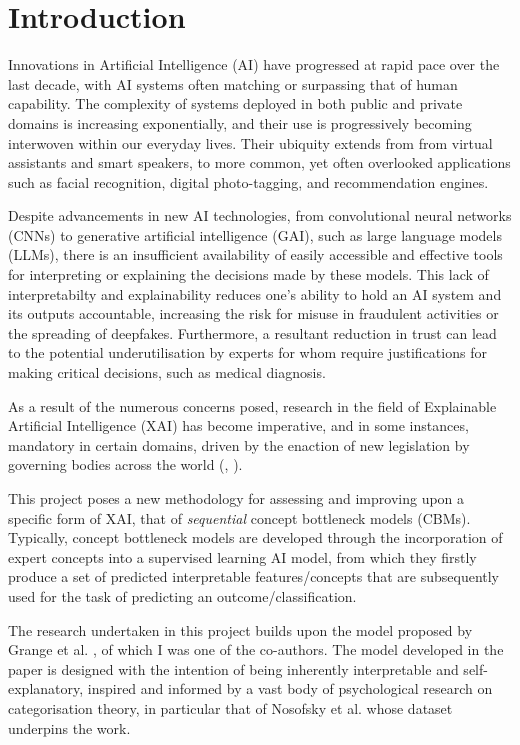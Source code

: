 \chapter{Introduction}

Innovations in Artificial Intelligence (AI) have progressed at rapid pace over the last decade, with AI systems often matching or surpassing that of human capability. The complexity of systems deployed in both public and private domains is increasing exponentially, and their use is progressively becoming interwoven within our everyday lives. Their ubiquity extends from from virtual assistants and smart speakers, to more common, yet often overlooked applications such as facial recognition, digital photo-tagging, and recommendation engines.

Despite advancements in new AI technologies, from convolutional neural networks (CNNs) to generative artificial intelligence (GAI), such as large language models (LLMs), there is an insufficient availability of easily accessible and effective tools for interpreting or explaining the decisions made by these models. This lack of interpretabilty and explainability reduces one's ability to hold an AI system and its outputs accountable, increasing the risk for misuse in fraudulent activities or the spreading of deepfakes. Furthermore, a resultant reduction in trust can lead to the potential underutilisation by experts for whom require justifications for making critical decisions, such as medical diagnosis. 

As a result of the numerous concerns posed, research in the field of Explainable Artificial Intelligence (XAI) has become imperative, and in some instances, mandatory in certain domains, driven by the enaction of new legislation by governing bodies across the world (\cite{worldeconomicforumPresidioRecommendationsResponsible2023}, \cite{goodmanEuropeanUnionRegulations2017a}).

This project poses a new methodology for assessing and improving upon a specific form of XAI, that of \emph{sequential} concept bottleneck models (CBMs). Typically, concept bottleneck models are developed through the incorporation of expert concepts into a supervised learning AI model, from which they firstly produce a set of predicted interpretable features/concepts that are subsequently used for the task of predicting an outcome/classification.

The research undertaken in this project builds upon the model proposed by Grange et al. \cite{grangeXAISelfexplanatoryAI2022}, of which I was one of the co-authors. The model developed in the paper is designed with the intention of being inherently interpretable and self-explanatory, inspired and informed by a vast body of psychological research on categorisation theory, in particular that of Nosofsky et al. whose dataset \cite{nosofskyDevelopmentFeaturespaceRepresentation2018} underpins the work.


